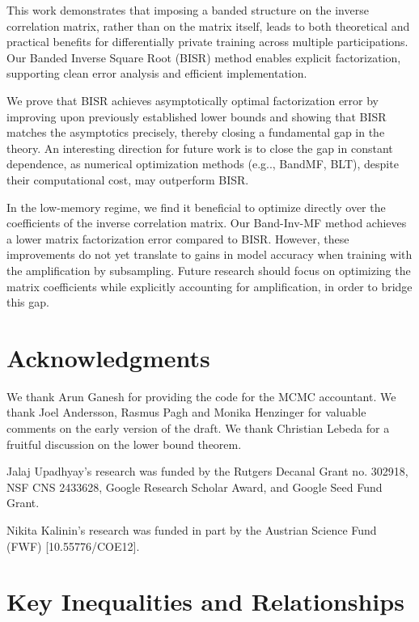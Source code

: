 \documentclass{article} %
\makeatletter
\DeclareRobustCommand\onedot{\futurelet\@let@token\@onedot}
\def\@onedot{\ifx\@let@token.\else.\null\fi\xspace}
\def\eg{{e.g}\onedot} \def\Eg{{E.g}\onedot}
\makeatother
\begin{document}
This work demonstrates that imposing a banded structure on the inverse correlation matrix, rather than on the matrix itself, leads to both theoretical and practical benefits for differentially private training across multiple participations. Our Banded Inverse Square Root (BISR) method enables explicit factorization, supporting clean error analysis and efficient implementation.

We prove that BISR achieves asymptotically optimal factorization error by improving upon previously established lower bounds and showing that BISR matches the asymptotics precisely, thereby closing a fundamental gap in the theory. An interesting direction for future work is to close the gap in constant dependence, as numerical optimization methods (\eg, BandMF, BLT), despite their computational cost, may outperform BISR.


In the low-memory regime, we find it beneficial to optimize directly over the coefficients of the inverse correlation matrix. 
Our Band-Inv-MF method achieves a lower matrix factorization error compared to BISR. However, these improvements do not yet translate to gains in model accuracy when training with the amplification by subsampling. Future research should focus on optimizing the matrix coefficients while explicitly accounting for amplification, in order to bridge this gap.

\section*{Acknowledgments}

We thank Arun Ganesh for providing the code for the MCMC accountant. We thank Joel Andersson, Rasmus Pagh and Monika Henzinger for valuable comments on the early version of the draft. We thank Christian Lebeda for a fruitful discussion on the lower bound theorem. 

Jalaj Upadhyay’s research was funded by the Rutgers Decanal Grant no. 302918, NSF CNS 2433628, Google Research Scholar Award, and Google Seed Fund Grant.


Nikita Kalinin's research was funded in part by the Austrian Science Fund (FWF) [10.55776/COE12].





\clearpage
\appendix

\renewcommand{\proofname}{Proof}



\section*{Key Inequalities and Relationships}
\end{document}
